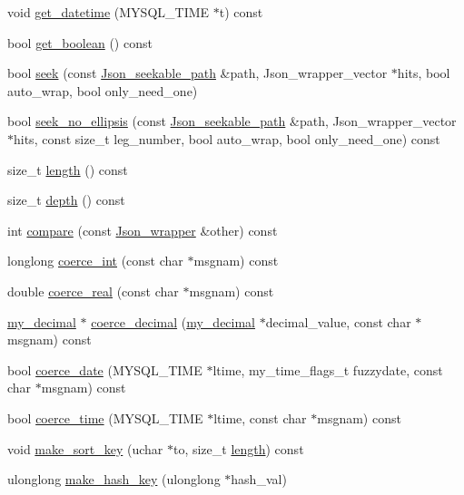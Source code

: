 \begin{DoxyCompactItemize}
\item 
void \mbox{\hyperlink{classJson__wrapper_a71486ebbd84384be89d6a607709b6370}{get\+\_\+datetime}} (M\+Y\+S\+Q\+L\+\_\+\+T\+I\+ME $\ast$t) const
\item 
bool \mbox{\hyperlink{classJson__wrapper_a41d981986c3627b7f73b1ed3ebc9f5db}{get\+\_\+boolean}} () const
\item 
bool \mbox{\hyperlink{classJson__wrapper_afcdaa3d406f1a1ab28da1330f0cf9680}{seek}} (const \mbox{\hyperlink{classJson__seekable__path}{Json\+\_\+seekable\+\_\+path}} \&path, Json\+\_\+wrapper\+\_\+vector $\ast$hits, bool auto\+\_\+wrap, bool only\+\_\+need\+\_\+one)
\item 
bool \mbox{\hyperlink{classJson__wrapper_a4f91ecdc2dc3406f156e188ae8f40b0e}{seek\+\_\+no\+\_\+ellipsis}} (const \mbox{\hyperlink{classJson__seekable__path}{Json\+\_\+seekable\+\_\+path}} \&path, Json\+\_\+wrapper\+\_\+vector $\ast$hits, const size\+\_\+t leg\+\_\+number, bool auto\+\_\+wrap, bool only\+\_\+need\+\_\+one) const
\item 
size\+\_\+t \mbox{\hyperlink{classJson__wrapper_ad69ab220db27a0ca1729a6bfcfeecc31}{length}} () const
\item 
size\+\_\+t \mbox{\hyperlink{classJson__wrapper_a0acab7edca5cf7c9e2a6ec3dd5c27bdb}{depth}} () const
\item 
int \mbox{\hyperlink{classJson__wrapper_aba6801a36265c71f07e888c5042f63df}{compare}} (const \mbox{\hyperlink{classJson__wrapper}{Json\+\_\+wrapper}} \&other) const
\item 
longlong \mbox{\hyperlink{classJson__wrapper_a8de6527e9d8d5f6ae904ed9ef8d0dbd7}{coerce\+\_\+int}} (const char $\ast$msgnam) const
\item 
double \mbox{\hyperlink{classJson__wrapper_a94564934ca950554208677eb238edf63}{coerce\+\_\+real}} (const char $\ast$msgnam) const
\item 
\mbox{\hyperlink{classmy__decimal}{my\+\_\+decimal}} $\ast$ \mbox{\hyperlink{classJson__wrapper_a870a8aa9e62221e7284e6a9dec4bd750}{coerce\+\_\+decimal}} (\mbox{\hyperlink{classmy__decimal}{my\+\_\+decimal}} $\ast$decimal\+\_\+value, const char $\ast$msgnam) const
\item 
bool \mbox{\hyperlink{classJson__wrapper_abab3c08cdbb5ffb1ecfaed140bd391d6}{coerce\+\_\+date}} (M\+Y\+S\+Q\+L\+\_\+\+T\+I\+ME $\ast$ltime, my\+\_\+time\+\_\+flags\+\_\+t fuzzydate, const char $\ast$msgnam) const
\item 
bool \mbox{\hyperlink{classJson__wrapper_a31da2ba0c06635c562a785596d868ee0}{coerce\+\_\+time}} (M\+Y\+S\+Q\+L\+\_\+\+T\+I\+ME $\ast$ltime, const char $\ast$msgnam) const
\item 
void \mbox{\hyperlink{classJson__wrapper_a7ccea914b374ff03975dda48cefe16de}{make\+\_\+sort\+\_\+key}} (uchar $\ast$to, size\+\_\+t \mbox{\hyperlink{classJson__wrapper_ad69ab220db27a0ca1729a6bfcfeecc31}{length}}) const
\item 
ulonglong \mbox{\hyperlink{classJson__wrapper_a98094981c9f237f0674d1fa15c8066e8}{make\+\_\+hash\+\_\+key}} (ulonglong $\ast$hash\+\_\+val)
\end{DoxyCompactItemize}


